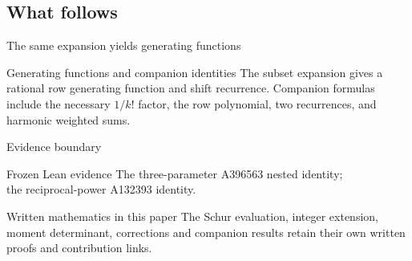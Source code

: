 \documentclass{beamer}
\begin{document}
\subsection{What follows}
\begin{frame}{The same expansion yields generating functions}
  \begin{block}{Generating functions and companion identities}
    The subset expansion gives a rational row generating function and shift recurrence. Companion formulas include the necessary $1/k!$ factor, the row polynomial, two recurrences, and harmonic weighted sums.
  \end{block}
\end{frame}
\begin{frame}{Evidence boundary}
  \begin{block}{Frozen Lean evidence}
    The three-parameter A396563 nested identity;\\
    the reciprocal-power A132393 identity.
  \end{block}
  \begin{alertblock}{Written mathematics in this paper}
    The Schur evaluation, integer extension, moment determinant, corrections and companion results retain their own written proofs and contribution links.
  \end{alertblock}
\end{frame}
\appendix
\FormalVerification
\end{document}
